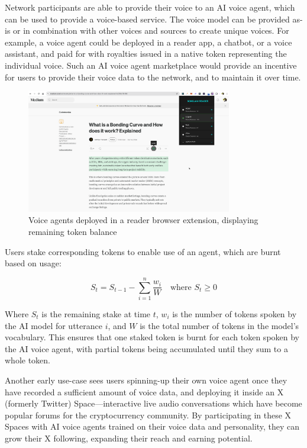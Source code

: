 \documentclass[11pt,a4paper]{article}
\begin{document}
Network participants are able to provide their voice to an AI voice agent, which can be used to provide a voice-based service.
The voice model can be provided \textquotesingle as-is\textquotesingle{} or in combination with other voices and sources to create unique voices.
For example, a voice agent could be deployed in a reader app, a chatbot, or a voice assistant, and paid for with royalties issued in a native token representing the individual voice.
Such an AI voice agent marketplace would provide an incentive for users to provide their voice data to the network, and to maintain it over time.

\begin{figure}[H]
    \centering
    \includegraphics[width=0.8\textwidth]{reader.png}
    \caption{Voice agents deployed in a reader browser extension, displaying remaining token balance}
    \label{fig:reader}
\end{figure}

Users stake corresponding tokens to enable use of an agent, which are burnt based on usage:

\begin{equation}
    S_t = S_{t-1} - \sum_{i=1}^{n} \frac{w_i}{W} \quad \text{where } S_t \geq 0
\end{equation}

Where $S_t$ is the remaining stake at time $t$, $w_i$ is the number of tokens spoken by the AI model for utterance $i$, and $W$ is the total number of tokens in the model's vocabulary. This ensures that one staked token is burnt for each token spoken by the AI voice agent, with partial tokens being accumulated until they sum to a whole token.

Another early use-case sees users spinning-up their own voice agent once they have recorded a sufficient amount of voice data, and deploying it inside an X (formerly Twitter) Space---interactive live audio conversations which have become popular forums for the cryptocurrency community.
By participating in these X Spaces with AI voice agents trained on their voice data and personality, they can grow their X following, expanding their reach and earning potential.
\end{document}
